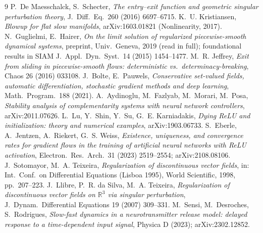 \documentclass[11pt]{article}
\begin{document}
\begin{thebibliography}{9}
 P.~De Maesschalck, S.~Schecter, \emph{The entry--exit function
and geometric singular perturbation theory}, J.~Diff.~Eq.\ 260 (2016) 6697--6715.
 K.~U. Kristiansen, \emph{Blowup for flat slow manifolds},
arXiv:1603.01821 (Nonlinearity, 2017).
 N.~Guglielmi, E.~Hairer, \emph{On the limit solution of regularized
piecewise-smooth dynamical systems}, preprint, Univ.\ Geneva, 2019 (read in
full); foundational results in SIAM J.~Appl.~Dyn.~Syst.\ 14 (2015) 1454--1477.
 M.~R. Jeffrey, \emph{Exit from sliding in piecewise-smooth
flows: deterministic vs.\ determinacy-breaking}, Chaos 26 (2016) 033108.
 J.~Bolte, E.~Pauwels, \emph{Conservative set-valued fields,
automatic differentiation, stochastic gradient methods and deep learning},
Math.~Program.\ 188 (2021).
 A.~Aydinoglu, M.~Fazlyab, M.~Morari, M.~Posa, \emph{Stability
analysis of complementarity systems with neural network controllers},
arXiv:2011.07626.
 L.~Lu, Y.~Shin, Y.~Su, G.~E. Karniadakis, \emph{Dying ReLU and
initialization: theory and numerical examples}, arXiv:1903.06733.
 S.~Eberle, A.~Jentzen, A.~Riekert, G.~S. Weiss,
\emph{Existence, uniqueness, and convergence rates for gradient flows in the
training of artificial neural networks with ReLU activation},
Electron.~Res.~Arch.\ 31 (2023) 2519--2554; arXiv:2108.08106.
 J.~Sotomayor, M.~A. Teixeira, \emph{Regularization of
discontinuous vector fields}, in: Int.\ Conf.\ on Differential Equations
(Lisboa 1995), World Scientific, 1998, pp.~207--223.
 J.~Llibre, P.~R. da Silva, M.~A. Teixeira, \emph{Regularization
of discontinuous vector fields on $\mathbb{R}^3$ via singular perturbation},
J.~Dynam.~Differential Equations 19 (2007) 309--331.
 M.~Sensi, M.~Desroches, S.~Rodrigues, \emph{Slow-fast dynamics
in a neurotransmitter release model: delayed response to a time-dependent input
signal}, Physica D (2023); arXiv:2302.12852.
\end{thebibliography}
\end{document}

